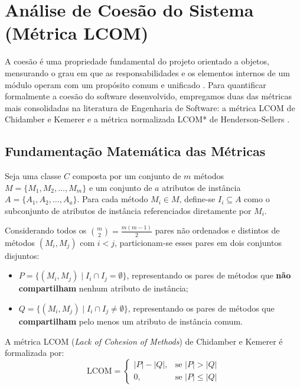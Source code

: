 \documentclass[12pt]{article}
\begin{document}
\section{Análise de Coesão do Sistema (Métrica LCOM)}

A coesão é uma propriedade fundamental do projeto orientado a objetos, mensurando o grau em que as responsabilidades e os elementos internos de um módulo operam com um propósito comum e unificado \cite{larman2004}. Para quantificar formalmente a coesão do software desenvolvido, empregamos duas das métricas mais consolidadas na literatura de Engenharia de Software: a métrica LCOM de Chidamber e Kemerer \cite{chidamber1994} e a métrica normalizada LCOM* de Henderson-Sellers \cite{henderson1996}.

\subsection{Fundamentação Matemática das Métricas}

Seja uma classe $C$ composta por um conjunto de $m$ métodos $M = \{M_1, M_2, \dots, M_m\}$ e um conjunto de $a$ atributos de instância $A = \{A_1, A_2, \dots, A_a\}$. Para cada método $M_i \in M$, define-se $I_i \subseteq A$ como o subconjunto de atributos de instância referenciados diretamente por $M_i$.

Considerando todos os $\binom{m}{2} = \frac{m(m-1)}{2}$ pares não ordenados e distintos de métodos $(M_i, M_j)$ com $i < j$, particionam-se esses pares em dois conjuntos disjuntos:
\begin{itemize}
    \item $P = \{ (M_i, M_j) \mid I_i \cap I_j = \emptyset \}$, representando os pares de métodos que \textbf{não compartilham} nenhum atributo de instância;
    \item $Q = \{ (M_i, M_j) \mid I_i \cap I_j \neq \emptyset \}$, representando os pares de métodos que \textbf{compartilham} pelo menos um atributo de instância comum.
\end{itemize}

A métrica LCOM (\textit{Lack of Cohesion of Methods}) de Chidamber e Kemerer \cite{chidamber1994} é formalizada por:
\begin{equation}
\text{LCOM} = \begin{cases} 
|P| - |Q|, & \text{se } |P| > |Q| \\ 
0, & \text{se } |P| \le |Q| 
\end{cases}
\end{equation}
\end{document}
